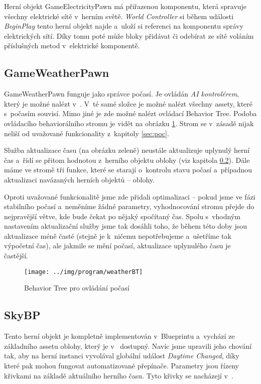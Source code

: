 Herní objekt GameElectricityPawn má přiřazenou komponentu\linebreak {}, která spravuje všechny elektrické sítě v~herním světě. \textit{World Controller} si během události \textit{BeginPlay} tento herní objekt najde a~uloží si referenci na komponentu správy elektrických sítí. Díky tomu poté může bloky přidávat či odebírat ze sítě voláním příslušných metod v~elektrické komponentě.


\subsection{GameWeatherPawn}
GameWeatherPawn funguje jako správce počasí. Je ovládán \textit{AI kontrolérem}, který je možné nalézt v~. V~té samé složce je možné nalézt všechny assety, které s~počasím souvisí. Mimo jiné je zde možné nalézt ovládací Behavior Tree. Podoba ovládacího behaviorálního stromu je vidět na obrázku \ref{fig:ue_weatherBP}. Strom se v~zásadě nijak neliší od uvažované funkcionality z~kapitoly \ref{sec:poc}.

Služba aktualizace času (na obrázku zeleně) neustále aktualizuje uplynulý herní čas a~řídí se přitom hodnotou z~herního objektu oblohy (viz kapitola \ref{subsec:skbp}). Dále máme ve stromě tři funkce, které se starají o~kontrolu stavu počasí a~případnou aktualizaci navázaných herních objektů -- oblohy. 

Oproti uvažované funkcionalitě jsme zde přidali optimalizaci -- pokud jsme ve fázi stabilního počasí a~neměníme žádné parametry, vyhodnocování stromu přejde do nejpravější větve, kde bude čekat po nějaký spočítaný čas. Spolu s~vhodným nastavením aktualizační služby jsme tak dosáhli toho, že během této doby jsou aktualizace méně časté (stejně je k~ničemu nepotřebujeme a~ušetříme tak výpočetní čas), ale jakmile se mění počasí, aktualizace uplynulého času je častější.


\begin{figure}[!ht]\centering
\texttt{[image: ../img/program/weatherBT]}
\caption{Behavior Tree pro ovládání počasí}
\label{fig:ue_weatherBP}
\end{figure}
\FloatBarrier



\subsection{SkyBP}
\label{subsec:skbp}

Tento herní objekt je kompletně implementován v~Blueprintu a~vychází ze základního assetu oblohy, který je v~\UEu{} dostupný. Navíc jsme upravili jeho chování tak, aby na herní instanci vyvolával globální událost \textit{Daytime Changed}, díky které pak mohou fungovat automatizované přepínače. Parametry jsou řízeny křivkami na základě aktuálního herního času. Tyto křivky se nacházejí v~.




